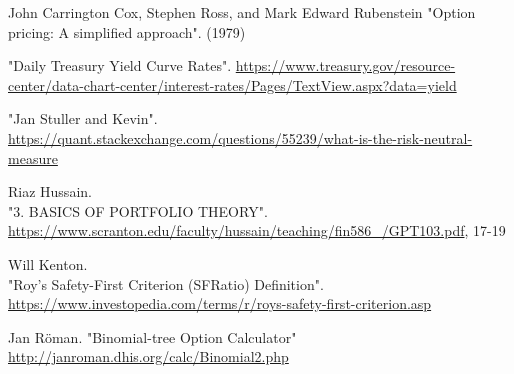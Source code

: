 \documentclass[12pt, letterpaper]{article}\usepackage{float}
\begin{document}
\begin{thebibliography}{9}
    John Carrington Cox, Stephen Ross, and Mark Edward Rubenstein
    "Option pricing: A simplified approach".
    (1979)

    "Daily Treasury Yield Curve Rates".
    \href{https://www.treasury.gov/resource-center/data-chart-center/interest-rates/Pages/TextView.aspx?data=yield}{https://www.treasury.gov/resource-center/data-chart-center/interest-rates/Pages/TextView.aspx?data=yield}

    "Jan Stuller and Kevin". \\
    \href{https://quant.stackexchange.com/questions/55239/what-is-the-risk-neutral-measure}{https://quant.stackexchange.com/questions/55239/what-is-the-risk-neutral-measure}

    Riaz Hussain. \\
    "3. BASICS OF PORTFOLIO THEORY". \\
    \href{https://www.scranton.edu/faculty/hussain/teaching/fin586\_/GPT103.pdf}{https://www.scranton.edu/faculty/hussain/teaching/fin586\_/GPT103.pdf},
    17-19

    Will Kenton. \\
    "Roy's Safety-First Criterion (SFRatio) Definition". \\
    \href{https://www.investopedia.com/terms/r/roys-safety-first-criterion.asp}{https://www.investopedia.com/terms/r/roys-safety-first-criterion.asp}

    Jan R\"{o}man.
    "Binomial-tree Option Calculator" \\
    \href{http://janroman.dhis.org/calc/Binomial2.php}{http://janroman.dhis.org/calc/Binomial2.php
}


\end{thebibliography}
\end{document}
